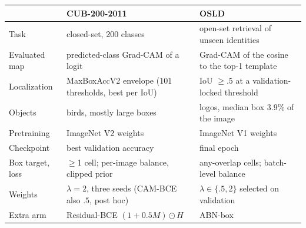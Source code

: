 \begingroup
\captionsetup{type=table}
\centering\footnotesize\setlength{\tabcolsep}{3pt}
\caption{The CUB study is related evidence, not a controlled transfer: these
differences between the two studies all vary at once.}
\label{tab:cub-osld}
\begin{tabular}{@{}p{}p{}p{}@{}}
\toprule
 & CUB-200-2011 & OSLD \\
\midrule
Task & closed-set, 200 classes & open-set retrieval of unseen identities \\
Evaluated map & predicted-class Grad-CAM of a logit & Grad-CAM of the cosine to the top-1 template \\
Localization & MaxBoxAccV2 envelope (101 thresholds, best per IoU) & IoU $\ge.5$ at a validation-locked threshold \\
Objects & birds, mostly large boxes & logos, median box 3.9\% of the image \\
Pretraining & ImageNet V2 weights & ImageNet V1 weights \\
Checkpoint & best validation accuracy & final epoch \\
Box target, loss & $\ge$1 cell; per-image balance, clipped prior & any-overlap cells; batch-level balance \\
Weights & $\lambda=2$, three seeds (CAM-BCE also $.5$, post hoc) & $\lambda\in\{.5,2\}$ selected on validation \\
Extra arm & Residual-BCE $(1+0.5M)\odot H$ & ABN-box \\
\bottomrule
\end{tabular}
\par
\endgroup

